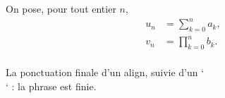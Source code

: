 On pose, pour tout entier $n$,
\begin{align*}
  u_n &= \sum_{k=0}^n a_k, \\
  v_n &= \prod_{k=0}^n b_k. \\
\end{align*}
\begin{proposition}
  La ponctuation finale d'un align, suivie d'un `\\` : la phrase est finie.
\end{proposition}
